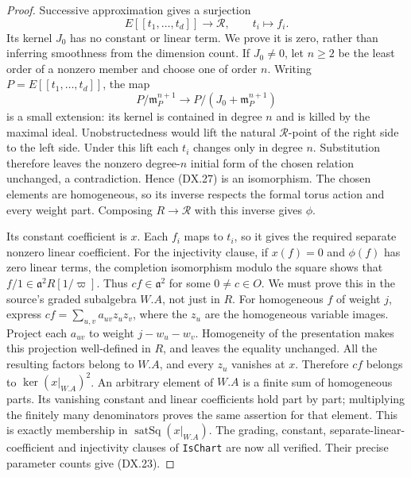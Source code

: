 \begin{proof}
Successive approximation gives a surjection
\[
       E[[t_1,\ldots,t_d]]\longrightarrow\mathcal R,
                         \qquad t_i\longmapsto f_i .
 \tag{DX.27}
\]
Its kernel $J_0$ has no constant or linear term.
We prove it is zero, rather than inferring smoothness from
the dimension count.  If $J_0\ne0$, let $n\ge2$ be the
least order of a nonzero member and choose one of order $n$.
Writing $P=E[[t_1,\ldots,t_d]]$, the map
\[
   P/\mathfrak m_P^{n+1}\longrightarrow
                         P/(J_0+\mathfrak m_P^{n+1})
 \tag{DX.28}
\]
is a small extension: its kernel is contained in degree $n$
and is killed by the maximal ideal.
Unobstructedness would lift the natural $\mathcal R$-point
of the right side to the left side.
Under this lift each $t_i$ changes only in degree $n$.
Substitution therefore leaves the nonzero degree-$n$
initial form of the chosen relation unchanged, a
contradiction.  Hence (DX.27) is an isomorphism.
The chosen elements are homogeneous, so its inverse respects
the formal torus action and every weight part.
Composing $R\to\mathcal R$ with this inverse gives $\phi$.

Its constant coefficient is $x$.  Each $f_i$ maps to $t_i$,
so it gives the required separate nonzero linear coefficient.
For the injectivity clause, if $x(f)=0$ and $\phi(f)$ has
zero linear terms, the completion isomorphism modulo the
square shows that $f/1\in\mathfrak a^2R[1/\varpi]$.
Thus $cf\in\mathfrak a^2$ for some $0\ne c\in O$.
We must prove this in the source's graded subalgebra $W.\!A$,
not just in $R$.
For homogeneous $f$ of weight $j$, express
$cf=\sum_{u,v}a_{uv}z_uz_v$, where the $z_u$ are the
homogeneous variable images.
Project each $a_{uv}$ to weight $j-w_u-w_v$.
Homogeneity of the presentation makes this projection
well-defined in $R$, and leaves the equality unchanged.
All the resulting factors belong to $W.\!A$, and every
$z_u$ vanishes at $x$.
Therefore $cf$ belongs to
$\ker(x|_{W.A})^2$.
An arbitrary element of $W.\!A$ is a finite sum of homogeneous
parts.  Its vanishing constant and linear coefficients hold
part by part; multiplying the finitely many denominators
proves the same assertion for that element.
This is exactly membership in $\operatorname{satSq}(x|_{W.A})$.
The grading, constant, separate-linear-coefficient and
injectivity clauses of \texttt{IsChart} are now all verified.
Their precise parameter counts give (DX.23).


\end{proof}
